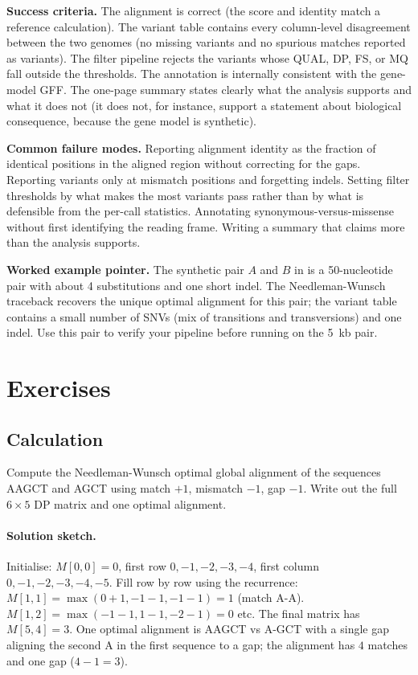 \begin{project}
\textbf{Success criteria.}
The alignment is correct (the score and identity match a reference
calculation). The variant table contains every column-level
disagreement between the two genomes (no missing variants and no
spurious matches reported as variants). The filter pipeline rejects
the variants whose QUAL, DP, FS, or MQ fall outside the thresholds.
The annotation is internally consistent with the gene-model GFF. The
one-page summary states clearly what the analysis supports and what
it does not (it does not, for instance, support a statement about
biological consequence, because the gene model is synthetic).

\textbf{Common failure modes.}
Reporting alignment identity as the fraction of identical positions
in the aligned region without correcting for the gaps. Reporting
variants only at mismatch positions and forgetting indels. Setting
filter thresholds by what makes the most variants pass rather than by
what is defensible from the per-call statistics. Annotating
synonymous-versus-missense without first identifying the reading
frame. Writing a summary that claims more than the analysis supports.

\textbf{Worked example pointer.}
The synthetic pair $A$ and $B$ in
is a 50-nucleotide pair with about 4 substitutions and one short
indel. The Needleman-Wunsch traceback recovers the unique optimal
alignment for this pair; the variant table contains a small number of
SNVs (mix of transitions and transversions) and one indel. Use this
pair to verify your pipeline before running on the 5~kb pair.
\end{project}

\section{Exercises}

\subsection*{Calculation}

\begin{exercise}
Compute the Needleman-Wunsch optimal global alignment of the
sequences AAGCT and AGCT using match $+1$, mismatch $-1$, gap $-1$.
Write out the full $6 \times 5$ DP matrix and one optimal alignment.

\paragraph{Solution sketch.}
Initialise: $M[0,0]=0$, first row $0,-1,-2,-3,-4$, first column
$0,-1,-2,-3,-4,-5$. Fill row by row using the recurrence:
$M[1,1]=\max(0+1, -1-1, -1-1)=1$ (match A-A).
$M[1,2]=\max(-1-1, 1-1, -2-1)=0$ etc.
The final matrix has $M[5,4]=3$. One optimal alignment is
AAGCT vs A-GCT with a single gap aligning the second A in the
first sequence to a gap; the alignment has $4$ matches and one gap
($4 - 1 = 3$).
\end{exercise}

